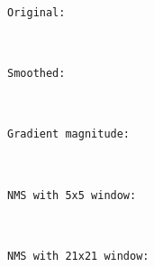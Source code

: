 \documentclass[11pt]{article}
\begin{document}
    \begin{Verbatim}[commandchars=\\\{\}]
Original:
\end{Verbatim}

    \begin{center}
    \end{center}
    { \hspace*{\fill} \\}
    
    \begin{Verbatim}[commandchars=\\\{\}]
Smoothed:
\end{Verbatim}

    \begin{center}
    \end{center}
    { \hspace*{\fill} \\}
    
    \begin{Verbatim}[commandchars=\\\{\}]
Gradient magnitude:
\end{Verbatim}

    \begin{center}
    \end{center}
    { \hspace*{\fill} \\}
    
    \begin{Verbatim}[commandchars=\\\{\}]
NMS with 5x5 window:
\end{Verbatim}

    \begin{center}
    \end{center}
    { \hspace*{\fill} \\}
    
    \begin{Verbatim}[commandchars=\\\{\}]
NMS with 21x21 window:
\end{Verbatim}

    \begin{center}
    \end{center}
    { \hspace*{\fill} \\}
    
\end{document}
